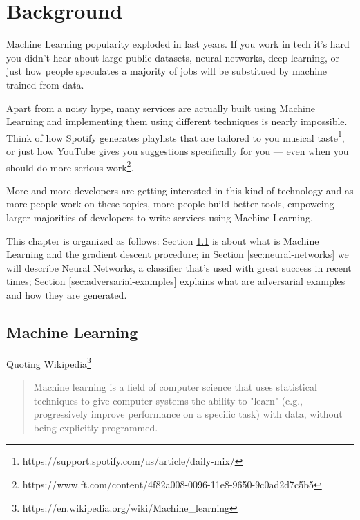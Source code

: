\chapter{Background}
\label{ch:background}

Machine Learning popularity exploded in last years. If you work in tech
it's hard you didn't hear about large public datasets, neural
networks, deep learning, or just how people speculates a majority of
jobs will be substitued by machine trained from data.

Apart from a noisy hype, many services are actually built using Machine
Learning and implementing them using different techniques is nearly
impossible. Think of how Spotify generates playlists that are tailored
to you musical
taste\footnote{https://support.spotify.com/us/article/daily-mix/}, or
just how YouTube gives you suggestions specifically for you
\cite{45530} --- even when you should do more serious
work\footnote{https://www.ft.com/content/4f82a008-0096-11e8-9650-9c0ad2d7c5b5}.

More and more developers are getting interested in this kind of
technology and as more people work on these topics, more people build
better tools, empoweing larger majorities of developers to write
services using Machine Learning.

This chapter is organized as follows: Section
\ref{sec:machine-learning} is about what is Machine Learning and the
gradient descent procedure; in Section \ref{sec:neural-networks} we will
describe Neural Networks, a classifier that's used with great success
in recent times; Section \ref{sec:adversarial-examples} explains what
are adversarial examples and how they are generated.

\section{Machine Learning}
\label{sec:machine-learning}

Quoting
Wikipedia\footnote{https://en.wikipedia.org/wiki/Machine\_learning}

\begin{quote}
Machine learning is a field of computer science that uses statistical
techniques to give computer systems the ability to "learn" (e.g.,
progressively improve performance on a specific task) with data,
without being explicitly programmed.
\end{quote}

